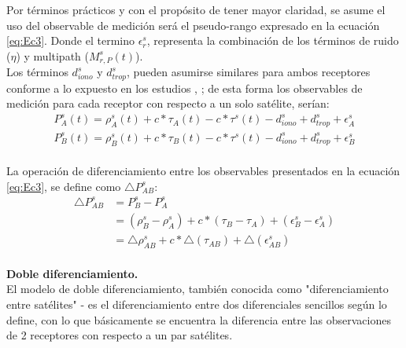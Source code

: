 Por términos prácticos y con el propósito de tener mayor claridad, se asume el uso del observable de medición será el pseudo-rango expresado en la ecuación \ref{eq:Ec3}. Donde el termino $\epsilon_{r}^{s}$, representa la combinación de los términos de ruido ($\eta$) y multipath ($M_{r,P}^{s}(t)$).\\ 

Los términos $d_{iono}^{s}$ y $d_{trop}^{s}$, pueden asumirse similares para ambos receptores conforme a lo expuesto en los estudios \cite{el1994effect}, \cite{blewitt1997basics}; de esta forma los observables de medición para cada receptor con respecto a un solo satélite, serían:\\

\begin{equation}
	\begin{aligned}
		P_{A}^{s}(t) = \rho_{A}^{s}(t) +c*\tau_{A}(t) - c*\tau^{s}(t) -d_{iono}^{s} + d_{trop}^{s} + \epsilon_{A}^{s}\\
		P_{B}^{s}(t) = \rho_{B}^{s}(t) +c*\tau_{B}(t) - c*\tau^{s}(t) -d_{iono}^{s} + d_{trop}^{s} + \epsilon_{B}^{s}
	\label{eq:Ec3}
	\end{aligned}
\end{equation}\\

La operación de diferenciamiento entre los observables presentados en la ecuación \ref{eq:Ec3}, se define como $\bigtriangleup P_{AB}^{s}$:\\

\begin{equation}
	\begin{aligned}
		\bigtriangleup P_{AB}^{s} 
		& = P_{B}^{s} - P_{A}^{s}\\
		& =(\rho_{B}^{s}-\rho_{A}^{s}) + c*(\tau_{B} - \tau_{A}) + (\epsilon_{B}^{s} - \epsilon_{A}^{s})\\
		& = \bigtriangleup \rho_{AB}^{s} + c*\bigtriangleup (\tau_{AB}) + \bigtriangleup(\epsilon_{AB}^{s})
	\label{eq:Ec4}
	\end{aligned}
\end{equation}\\


\textbf{Doble diferenciamiento.}\\

El modelo de doble diferenciamiento, también conocida como "diferenciamiento entre satélites"\cite{van2008gps} - es el diferenciamiento entre dos diferenciales sencillos según lo define, con lo que básicamente se encuentra la diferencia entre las observaciones de 2 receptores con respecto a un par satélites.\\

